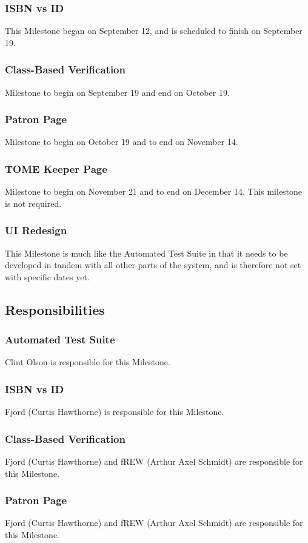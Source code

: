 \documentclass[12pt,titlepage]{article}
\begin{document}
\subsubsection{ISBN vs ID}
This Milestone began on September 12, and is scheduled to finish on September 19.
\subsubsection{Class-Based Verification}
Milestone to begin on September 19 and end on October 19.
\subsubsection{Patron Page}
Milestone to begin on October 19 and to end on November 14.
\subsubsection{TOME Keeper Page}
Milestone to begin on November 21 and to end on December 14.  This milestone is not required.
\subsubsection{UI Redesign}
This Milestone is much like the Automated Test Suite in that it needs to be developed in tandem with all other parts of the system, and is therefore not set with specific dates yet.
\subsection{Responsibilities}
\subsubsection{Automated Test Suite}
Clint Olson is responsible for this Milestone.
\subsubsection{ISBN vs ID}
Fjord (Curtis Hawthorne) is responsible for this Milestone.
\subsubsection{Class-Based Verification}
Fjord (Curtis Hawthorne) and fREW (Arthur Axel Schmidt) are responsible for this Milestone.
\subsubsection{Patron Page}
Fjord (Curtis Hawthorne) and fREW (Arthur Axel Schmidt) are responsible for this Milestone.
\end{document}
